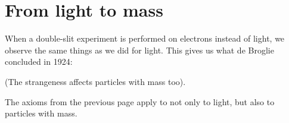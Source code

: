 \documentclass{article}
\begin{document}
%

\section*{From light to mass}

When a double-slit experiment is performed on electrons instead of light, we observe the same things as we did for light. This gives us what de Broglie concluded in 1924:

\begin{axiom}
	(The strangeness affects particles with mass too).
	
	The axioms from the previous page apply to not only to light, but also to particles with mass.
\end{axiom}
\end{document}

